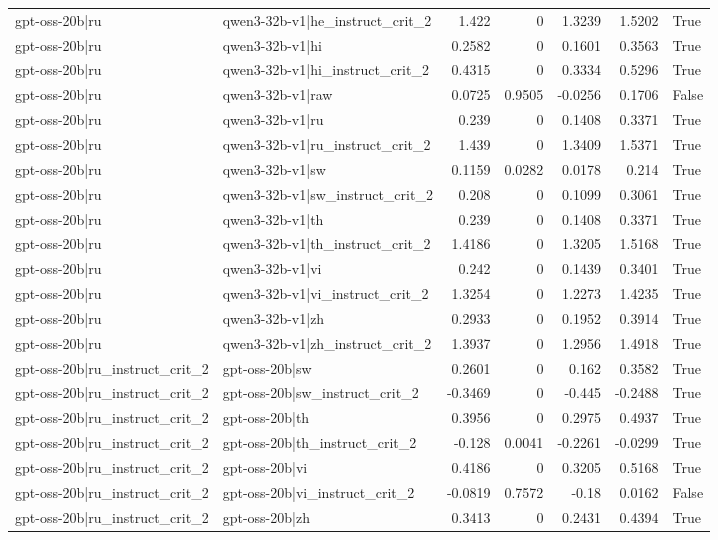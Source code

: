 \begin{table}
\begin{tabular}{l l r r r r l}
gpt-oss-20b|ru & qwen3-32b-v1|he_instruct_crit_2 & 1.422 & 0 & 1.3239 & 1.5202 & True \\
gpt-oss-20b|ru & qwen3-32b-v1|hi & 0.2582 & 0 & 0.1601 & 0.3563 & True \\
gpt-oss-20b|ru & qwen3-32b-v1|hi_instruct_crit_2 & 0.4315 & 0 & 0.3334 & 0.5296 & True \\
gpt-oss-20b|ru & qwen3-32b-v1|raw & 0.0725 & 0.9505 & -0.0256 & 0.1706 & False \\
gpt-oss-20b|ru & qwen3-32b-v1|ru & 0.239 & 0 & 0.1408 & 0.3371 & True \\
gpt-oss-20b|ru & qwen3-32b-v1|ru_instruct_crit_2 & 1.439 & 0 & 1.3409 & 1.5371 & True \\
gpt-oss-20b|ru & qwen3-32b-v1|sw & 0.1159 & 0.0282 & 0.0178 & 0.214 & True \\
gpt-oss-20b|ru & qwen3-32b-v1|sw_instruct_crit_2 & 0.208 & 0 & 0.1099 & 0.3061 & True \\
gpt-oss-20b|ru & qwen3-32b-v1|th & 0.239 & 0 & 0.1408 & 0.3371 & True \\
gpt-oss-20b|ru & qwen3-32b-v1|th_instruct_crit_2 & 1.4186 & 0 & 1.3205 & 1.5168 & True \\
gpt-oss-20b|ru & qwen3-32b-v1|vi & 0.242 & 0 & 0.1439 & 0.3401 & True \\
gpt-oss-20b|ru & qwen3-32b-v1|vi_instruct_crit_2 & 1.3254 & 0 & 1.2273 & 1.4235 & True \\
gpt-oss-20b|ru & qwen3-32b-v1|zh & 0.2933 & 0 & 0.1952 & 0.3914 & True \\
gpt-oss-20b|ru & qwen3-32b-v1|zh_instruct_crit_2 & 1.3937 & 0 & 1.2956 & 1.4918 & True \\
gpt-oss-20b|ru_instruct_crit_2 & gpt-oss-20b|sw & 0.2601 & 0 & 0.162 & 0.3582 & True \\
gpt-oss-20b|ru_instruct_crit_2 & gpt-oss-20b|sw_instruct_crit_2 & -0.3469 & 0 & -0.445 & -0.2488 & True \\
gpt-oss-20b|ru_instruct_crit_2 & gpt-oss-20b|th & 0.3956 & 0 & 0.2975 & 0.4937 & True \\
gpt-oss-20b|ru_instruct_crit_2 & gpt-oss-20b|th_instruct_crit_2 & -0.128 & 0.0041 & -0.2261 & -0.0299 & True \\
gpt-oss-20b|ru_instruct_crit_2 & gpt-oss-20b|vi & 0.4186 & 0 & 0.3205 & 0.5168 & True \\
gpt-oss-20b|ru_instruct_crit_2 & gpt-oss-20b|vi_instruct_crit_2 & -0.0819 & 0.7572 & -0.18 & 0.0162 & False \\
gpt-oss-20b|ru_instruct_crit_2 & gpt-oss-20b|zh & 0.3413 & 0 & 0.2431 & 0.4394 & True \\

\end{tabular}
\end{table}
